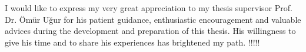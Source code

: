 I would like to express my very great appreciation to my thesis supervisor Prof. Dr. \"Om\"ur U{\u{g}}ur for his patient guidance, enthusiastic encouragement and valuable advices during the development and preparation of this thesis. His willingness to give his time and to share his experiences has brightened my path.
!!!!!

